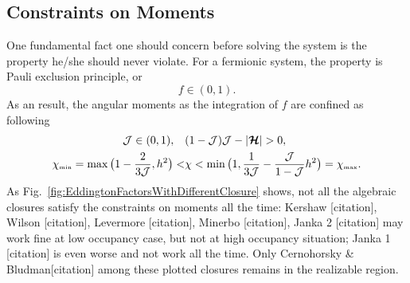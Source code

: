 \subsection{Constraints on Moments}
One fundamental fact one should concern before solving the system is the property he/she should never violate.
For a fermionic system, the property is Pauli exclusion principle, or 
\begin{equation}
f \in (0,1).
\end{equation}
As an result, the angular moments as the integration of $f$ are confined as following
\begin{align}
\mathcal{J} \in(0,1), \quad &(1-\mathcal{J})\mathcal{J}-|\boldsymbol{\mathcal{H}}|  > 0, \\
  \chi_{\mbox{\tiny min}}
  =\max\big(1-\frac{2}{3\mathcal{J}},h^{2}\big)
  < & \chi<\min\big(1,\frac{1}{3\mathcal{J}}-\frac{\mathcal{J}}{1-\mathcal{J}}h^{2}\big)=\chi_{\mbox{\tiny max}}.  
  \label{eq:eddingtonFactorBounds}
\end{align}
As Fig.~\eqref{fig:EddingtonFactorsWithDifferentClosure} shows, not all the algebraic closures satisfy the constraints on moments all the time: Kershaw [citation], Wilson [citation], Levermore [citation], Minerbo [citation], Janka 2 [citation] may work fine at low occupancy case, but not at high occupancy situation; Janka 1 [citation] is even worse and not work all the time. Only Cernohorsky \& Bludman[citation] among these plotted closures remains in the realizable region.

